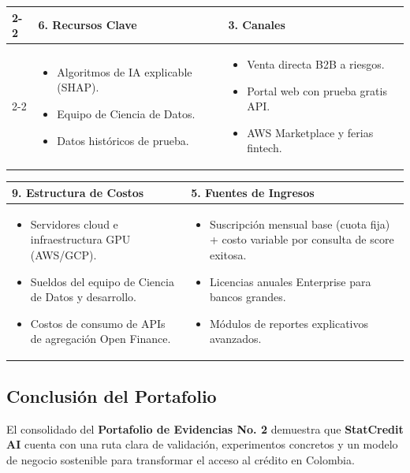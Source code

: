 \documentclass[11pt,a4paper]{article}
\begin{document}
\begin{table}[h!]
\begin{tabularx}{\linewidth}{|X|X|X|X|X|}
\cline{2-2} \cline{4-4}
 & \rowcolor{lightgray} 
\textbf{6. Recursos Clave} & & \rowcolor{lightgray} 
\textbf{3. Canales} & \\
\cline{2-2} \cline{4-4}
 & \begin{itemize}[leftmargin=*]
    \item Algoritmos de IA explicable (SHAP).
    \item Equipo de Ciencia de Datos.
    \item Datos históricos de prueba.
\end{itemize} & & \begin{itemize}[leftmargin=*]
    \item Venta directa B2B a riesgos.
    \item Portal web con prueba gratis API.
    \item AWS Marketplace y ferias fintech.
\end{itemize} & \\
\hline
\end{tabularx}
\end{table}

\begin{table}[h!]
\centering
\small
\begin{tabularx}{\linewidth}{|X|X|}
\hline
\rowcolor{lightgray}
\textbf{9. Estructura de Costos} & 
\textbf{5. Fuentes de Ingresos} \\
\hline
\begin{itemize}[leftmargin=*]
    \item Servidores cloud e infraestructura GPU (AWS/GCP).
    \item Sueldos del equipo de Ciencia de Datos y desarrollo.
    \item Costos de consumo de APIs de agregación Open Finance.
\end{itemize} & 
\begin{itemize}[leftmargin=*]
    \item Suscripción mensual base (cuota fija) + costo variable por consulta de score exitosa.
    \item Licencias anuales Enterprise para bancos grandes.
    \item Módulos de reportes explicativos avanzados.
\end{itemize} \\
\hline
\end{tabularx}
\end{table}

\subsection{Conclusión del Portafolio}
El consolidado del \textbf{Portafolio de Evidencias No. 2} demuestra que \textbf{StatCredit AI} cuenta con una ruta clara de validación, experimentos concretos y un modelo de negocio sostenible para transformar el acceso al crédito en Colombia.
\end{document}
